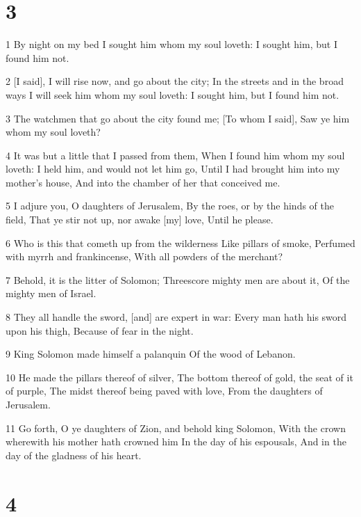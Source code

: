 \chapter{3}

\par 1 By night on my bed I sought him whom my soul loveth: I sought him, but I found him not.
\par 2 [I said], I will rise now, and go about the city; In the streets and in the broad ways I will seek him whom my soul loveth: I sought him, but I found him not.
\par 3 The watchmen that go about the city found me; [To whom I said], Saw ye him whom my soul loveth?
\par 4 It was but a little that I passed from them, When I found him whom my soul loveth: I held him, and would not let him go, Until I had brought him into my mother's house, And into the chamber of her that conceived me.
\par 5 I adjure you, O daughters of Jerusalem, By the roes, or by the hinds of the field, That ye stir not up, nor awake [my] love, Until he please.
\par 6 Who is this that cometh up from the wilderness Like pillars of smoke, Perfumed with myrrh and frankincense, With all powders of the merchant?
\par 7 Behold, it is the litter of Solomon; Threescore mighty men are about it, Of the mighty men of Israel.
\par 8 They all handle the sword, [and] are expert in war: Every man hath his sword upon his thigh, Because of fear in the night.
\par 9 King Solomon made himself a palanquin Of the wood of Lebanon.
\par 10 He made the pillars thereof of silver, The bottom thereof of gold, the seat of it of purple, The midst thereof being paved with love, From the daughters of Jerusalem.
\par 11 Go forth, O ye daughters of Zion, and behold king Solomon, With the crown wherewith his mother hath crowned him In the day of his espousals, And in the day of the gladness of his heart.

\chapter{4}

